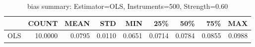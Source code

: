 \begin{table}[ht]
\centering
\caption{bias summary: Estimator=OLS, Instruments=500, Strength=0.60}
\begin{tabular}{lrrrrrrrr}
\toprule
 & COUNT & MEAN & STD & MIN & 25\% & 50\% & 75\% & MAX \\
\midrule
OLS & 10.0000 & 0.0795 & 0.0110 & 0.0651 & 0.0714 & 0.0784 & 0.0855 & 0.0988 \\
\bottomrule
\end{tabular}
\end{table}
